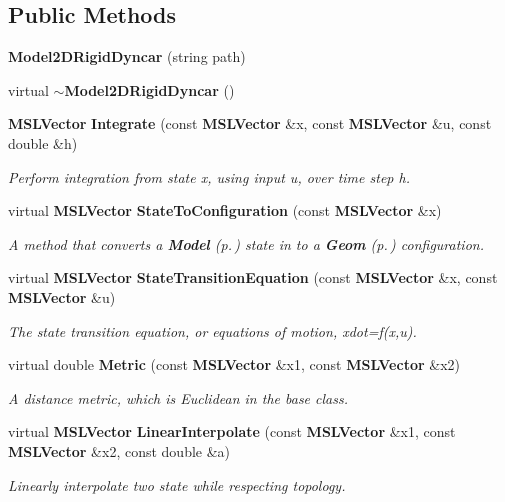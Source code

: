 \subsection*{Public Methods}
\begin{CompactItemize}
\item 
{\bf Model2DRigid\-Dyncar} (string path)
\item 
virtual {\bf $\sim$Model2DRigid\-Dyncar} ()
\item 
{\bf MSLVector} {\bf Integrate} (const {\bf MSLVector} \&x, const {\bf MSLVector} \&u, const double \&h)
\begin{CompactList}\small\item\em Perform integration from state x, using input u, over time step h.\item\end{CompactList}\item 
virtual {\bf MSLVector} {\bf State\-To\-Configuration} (const {\bf MSLVector} \&x)
\begin{CompactList}\small\item\em A method that converts a {\bf Model} {\rm (p.\,\pageref{class_Model})} state in to a {\bf Geom} {\rm (p.\,\pageref{class_Geom})} configuration.\item\end{CompactList}\item 
virtual {\bf MSLVector} {\bf State\-Transition\-Equation} (const {\bf MSLVector} \&x, const {\bf MSLVector} \&u)
\begin{CompactList}\small\item\em The state transition equation, or equations of motion, xdot=f(x,u).\item\end{CompactList}\item 
virtual double {\bf Metric} (const {\bf MSLVector} \&x1, const {\bf MSLVector} \&x2)
\begin{CompactList}\small\item\em A distance metric, which is Euclidean in the base class.\item\end{CompactList}\item 
virtual {\bf MSLVector} {\bf Linear\-Interpolate} (const {\bf MSLVector} \&x1, const {\bf MSLVector} \&x2, const double \&a)
\begin{CompactList}\small\item\em Linearly interpolate two state while respecting topology.\item\end{CompactList}\end{CompactItemize}
